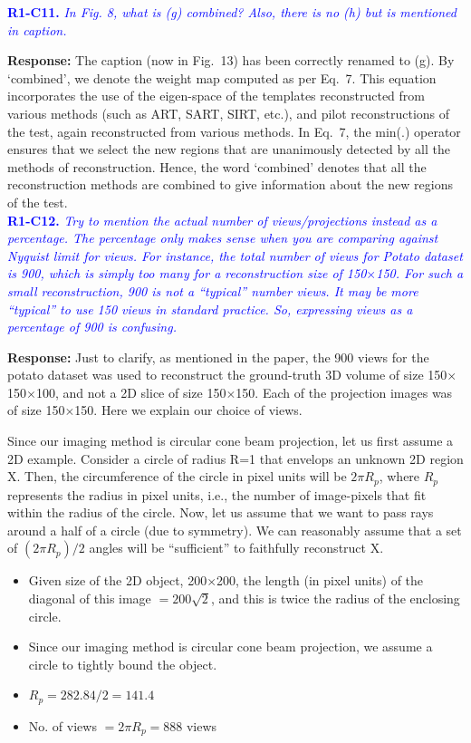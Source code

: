 \documentclass{article}
\begin{document}
\textcolor{blue}{\textbf{R1-C11.}\textit{ In Fig. 8, what is (g) combined? Also, there is no (h) but is mentioned in caption.}}

\textbf{Response:} The caption (now in Fig.~13) has been correctly renamed to (g). 
By `combined', we denote the weight map computed as per Eq.~7.  This equation incorporates the use of the eigen-space of the templates reconstructed from various methods (such as ART, SART, SIRT, etc.), and pilot reconstructions of the test,  again reconstructed from various methods. In Eq.~7, the min(.) operator ensures that we select the new regions that are unanimously detected by all the methods of reconstruction. Hence, the word `combined' denotes that all the reconstruction methods are combined to give information about the new regions of the test.\\

\textcolor{blue}{\textbf{R1-C12.}\textit{ Try to mention the actual number of views/projections instead as a percentage. The percentage only makes sense when you are comparing against Nyquist limit for views. For instance, the total number of views for Potato dataset is 900, which is simply too many for a reconstruction size of 150$\times$150. For such a small reconstruction, 900 is not a ``typical'' number views. It may be more ``typical'' to use 150 views in standard practice. So, expressing views as a percentage of 900 is confusing.}}
  
  \textbf{Response:} Just to clarify, as mentioned in the paper, the 900 views for the potato dataset was used to reconstruct the ground-truth 3D volume of size 150$\times$150$\times$100, and not a 2D slice of size 150$\times$150.  Each of the projection images was of size 150$\times$150. Here we explain our choice of views.
  
Since our imaging method is circular cone beam projection, let us first assume a 2D example. Consider a circle of radius R=1 that envelops an unknown 2D region X. Then, the circumference of the circle in pixel units will be $2\pi R_p$, where $R_p$ represents the radius in pixel units, i.e., the number of image-pixels that fit within the radius of the circle. Now, let us assume that we want to pass rays around a half of a circle (due to symmetry). We can reasonably assume that a set of $(2\pi R_p)/2$ angles will be ``sufficient'' to faithfully reconstruct X.
\begin{itemize}
\item Given size of the 2D object, 200$\times$200, the length (in pixel units) of the diagonal of this image $= 200\sqrt 2$, and this is twice the radius of the enclosing circle.
\item Since our imaging method is circular cone beam projection, we assume a circle to tightly bound the object.
\item $R_p = 282.84/2 = 141.4$
\item No. of views $= 2\pi R_p = 888$ views
\end{itemize}
\end{document}
